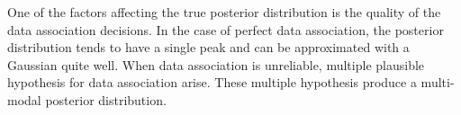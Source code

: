 One of the factors affecting the true posterior distribution is the
quality of the data association decisions. In the case of perfect data
association, the posterior distribution tends to have a single peak
and can be approximated with a Gaussian quite well. When data
association is unreliable, multiple plausible hypothesis for data
association arise. These multiple hypothesis produce a multi-modal
posterior distribution. 


\begin{figure}
\begin{center}
\\
\quad\space
{}
\end{center}
\end{figure}
